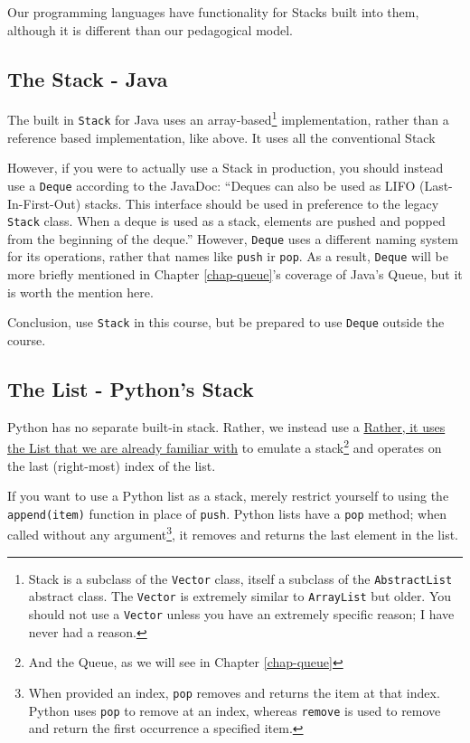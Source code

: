 Our programming languages have functionality for Stacks built into them, although it is different than 
our pedagogical model.
\subsection{The Stack - Java}
The built in \texttt{Stack} for Java uses an array-based\footnote{Stack is a subclass of the \texttt{Vector} class, itself a subclass of the \texttt{AbstractList} abstract class.  The \texttt{Vector} is extremely similar to \texttt{ArrayList} but older.  You should not use a \texttt{Vector} unless you have an extremely specific reason;  I have never had a reason.} implementation, rather than a reference based implementation, like above.  It uses all the conventional Stack

However, if you were to actually use a Stack in production, you should instead use a \texttt{Deque} according to the JavaDoc:
``Deques can also be used as LIFO (Last-In-First-Out) stacks. This interface should be used in preference to the legacy \texttt{Stack} class. When a deque is used as a stack, elements are pushed and popped from the beginning of the deque.'' 
However, \texttt{Deque} uses a different naming system for its operations, rather that names like \texttt{push} ir \texttt{pop}.  As a result, \texttt{Deque} will be more briefly mentioned in Chapter \ref{chap-queue}'s coverage of Java's Queue, but it is worth the mention here. 
 
Conclusion, use \texttt{Stack} in this course, but be prepared to use \texttt{Deque} outside the course.


\subsection{The List - Python's Stack}
Python has no separate built-in stack. Rather, we instead use a  \href{https://docs.python.org/3/tutorial/datastructures.html#using-lists-as-stacks} {Rather, it uses the List that we are already familiar with} to emulate a stack\footnote{And the Queue, as we will see in Chapter \ref{chap-queue}} and operates on the last (right-most) index of the list.

If you want to use a Python list as a stack, merely restrict yourself to using the \texttt{append(item)} function in place of \texttt{push}.
Python lists have a \texttt{pop} method;  when called without any argument\footnote{When provided an index, \texttt{pop} removes and returns the item at that index.  
Python uses \texttt{pop} to remove at an index, whereas \texttt{remove} is used to remove and return the first occurrence a specified item.},  it removes and returns the last element in the list.

